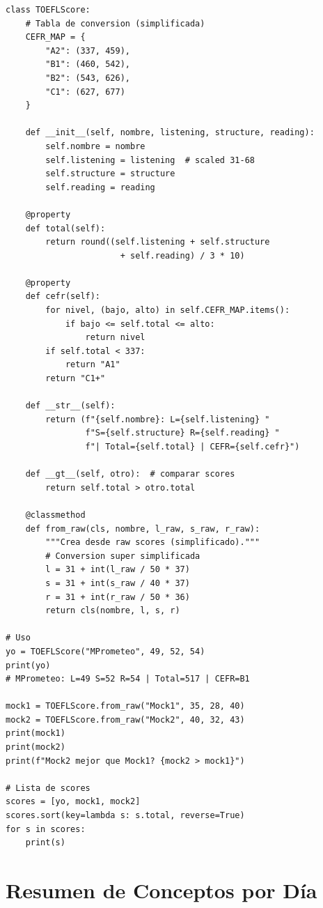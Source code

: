 \documentclass[10pt,a4paper]{article}
\begin{document}
\begin{lstlisting}
class TOEFLScore:
    # Tabla de conversion (simplificada)
    CEFR_MAP = {
        "A2": (337, 459),
        "B1": (460, 542),
        "B2": (543, 626),
        "C1": (627, 677)
    }

    def __init__(self, nombre, listening, structure, reading):
        self.nombre = nombre
        self.listening = listening  # scaled 31-68
        self.structure = structure
        self.reading = reading

    @property
    def total(self):
        return round((self.listening + self.structure
                       + self.reading) / 3 * 10)

    @property
    def cefr(self):
        for nivel, (bajo, alto) in self.CEFR_MAP.items():
            if bajo <= self.total <= alto:
                return nivel
        if self.total < 337:
            return "A1"
        return "C1+"

    def __str__(self):
        return (f"{self.nombre}: L={self.listening} "
                f"S={self.structure} R={self.reading} "
                f"| Total={self.total} | CEFR={self.cefr}")

    def __gt__(self, otro):  # comparar scores
        return self.total > otro.total

    @classmethod
    def from_raw(cls, nombre, l_raw, s_raw, r_raw):
        """Crea desde raw scores (simplificado)."""
        # Conversion super simplificada
        l = 31 + int(l_raw / 50 * 37)
        s = 31 + int(s_raw / 40 * 37)
        r = 31 + int(r_raw / 50 * 36)
        return cls(nombre, l, s, r)

# Uso
yo = TOEFLScore("MPrometeo", 49, 52, 54)
print(yo)
# MPrometeo: L=49 S=52 R=54 | Total=517 | CEFR=B1

mock1 = TOEFLScore.from_raw("Mock1", 35, 28, 40)
mock2 = TOEFLScore.from_raw("Mock2", 40, 32, 43)
print(mock1)
print(mock2)
print(f"Mock2 mejor que Mock1? {mock2 > mock1}")

# Lista de scores
scores = [yo, mock1, mock2]
scores.sort(key=lambda s: s.total, reverse=True)
for s in scores:
    print(s)
\end{lstlisting}

\section*{Resumen de Conceptos por D\'ia}
\end{document}
